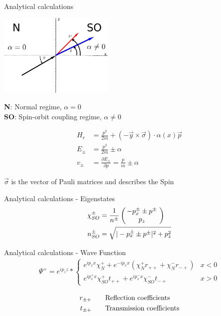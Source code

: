\documentclass{beamer}
\newcommand{\vect}[2]{\ensuremath{\inp{\hspace{-.8ex}\begin{array}{c}#1\\#2\end{array}\hspace{-.4ex}}}}
\newcommand{\inp}[1]{\ensuremath{\left(#1\right)}}
\begin{document}
\begin{frame}{Analytical calculations}
    \begin{multicols}{2}
        \includegraphics[width=55mm]{setup-simple}

        \begin{minipage}{0.5\textwidth}
            \textbf{N}: Normal regime, $\alpha = 0$\\
            \textbf{SO}: Spin-orbit coupling regime, $\alpha \not= 0$
        \end{minipage}

    \begin{align*}
        H_r &= \frac{p^2}{2m} + (-\vec y \times \vec \sigma) \cdot
                \alpha(x) \vec p\\ 
        E_{\pm} &= \frac{p^2}{2m} \pm \alpha \\
        v_{\pm} &= \frac{\partial E_{\pm}}{\partial p} = \frac{p}{m} \pm \alpha
    \end{align*}

    $\vec \sigma$ is the vector of Pauli matrices and describes the Spin

    \end{multicols}
\end{frame}


\begin{frame}{Analytical calculations - Eigenstates}
    \begin{align*}
    \chi_{SO}^{\pm} &= \frac{1}{n^{\pm}} 
                        \vect{-p_{x}^{\pm} \pm p^\pm}{p_z} \\
        n_{SO}^{\pm}   &= \sqrt{|-p_{x}^{\pm} \pm p^\pm|^2 + p_z^2}
    \end{align*}
\end{frame}
\begin{frame}{Analytical calculations - Wave Function}
    \begin{align*}
        \Psi^+ = e^{i p_z z} * \left\{
            \begin{array}{ll}
                e^{i p_x x} \chi_N^+ + e^{- i p_x x} (\chi_N^+ r_{++} +
                        \chi_N^- r_{-+})    & x < 0\\
                e^{i p_x^+ x} \chi_{SO}^+ t_{++} + e^{i p_x^- x}
                \chi_{SO}^- t_{-+}          & x > 0
            \end{array} \right.
    \end{align*}

    \begin{align*}
        r_{\pm+} \qquad & \textnormal{Reflection coefficients}\\
        t_{\pm+} \qquad & \textnormal{Transmission coefficients}
    \end{align*}

\end{frame}
\end{document}
